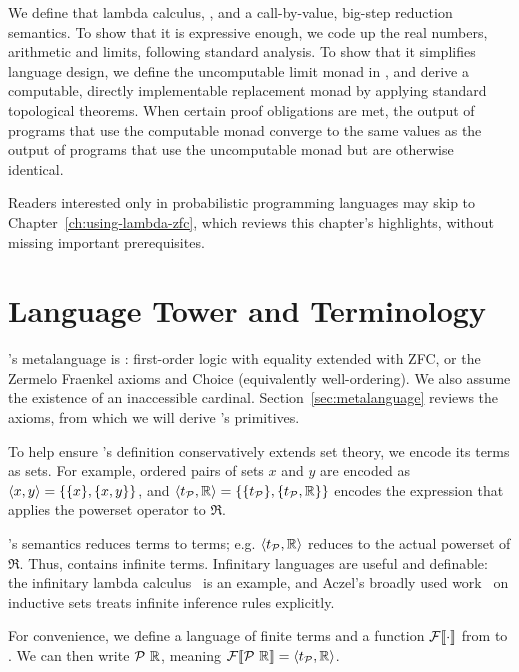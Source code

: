 We define that lambda calculus, \targetlang, and a call-by-value, big-step reduction semantics. To show that it is expressive enough, we code up the real numbers, arithmetic and limits, following standard analysis. To show that it simplifies language design, we define the uncomputable limit monad in \targetlang, and derive a computable, directly implementable replacement monad by applying standard topological theorems. When certain proof obligations are met, the output of programs that use the computable monad converge to the same values as the output of programs that use the uncomputable monad but are otherwise identical.

Readers interested only in probabilistic programming languages may skip to Chapter~\ref{ch:using-lambda-zfc}, which reviews this chapter's highlights, without missing important prerequisites.


\section{Language Tower and Terminology}

\targetlang's metalanguage is : first-order logic with equality extended with ZFC, or the Zermelo Fraenkel axioms and Choice (equivalently well-ordering). We also assume the existence of an inaccessible cardinal. Section~\ref{sec:metalanguage} reviews the axioms, from which we will derive \targetlang's primitives.

To help ensure \targetlang's definition conservatively extends set theory, we encode its terms as sets. For example, ordered pairs of sets $x$ and $y$ are encoded as $\langle{x,y}\rangle = \{{\{{x}\},\{{x,y}\}}\}$, and $\langle{t_{\mathcal{P}},\mathbb{R}}\rangle = \{{\{{t_{\mathcal{P}}}\},\{{t_{\mathcal{P}},\mathbb{R}}\}}\}$ encodes the expression that applies the powerset operator to $\Re$.

\targetlang's semantics reduces terms to terms; e.g. $\langle{t_{\mathcal{P}},\mathbb{R}}\rangle$ reduces to the actual powerset of $\Re$.
Thus, \targetlang contains infinite terms.
Infinitary languages are useful and definable: the infinitary lambda calculus~\cite{cit:kennaway-1996-inf-lc} is an example, and Aczel's broadly used work~\cite{cit:aczel-1977-inductive} on inductive sets treats infinite inference rules explicitly.

For convenience, we define a language \ftargetlang of finite terms and a function $\mathcal{F}\!\left\llbracket{\cdot}\right\rrbracket$ from \ftargetlang to \targetlang. We can then write $\mathcal{P}~\mathbb{R}$, meaning $\mathcal{F}\!\left\llbracket{\mathcal{P}~\mathbb{R}}\right\rrbracket = \langle{t_{\mathcal{P}},\mathbb{R}}\rangle$.

